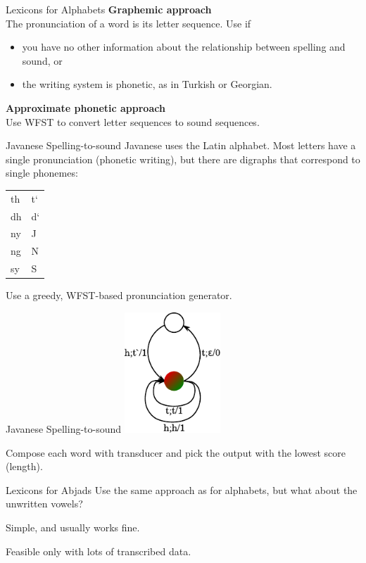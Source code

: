 \begin{frame}{Lexicons for Alphabets}{}
  {\color{DarkerBlue}\bf Graphemic approach} \\
  The pronunciation of a word is its letter sequence.  Use if
  \begin{itemize}
  \item you have no other information about the relationship between
    spelling and sound, or
  \item the writing system is phonetic, as in Turkish or Georgian.
  \end{itemize}
  \vfill
  {\color{DarkerBlue}\bf Approximate phonetic approach} \\
  Use WFST to convert letter sequences to sound sequences.      
\end{frame}

\begin{frame}{Javanese Spelling-to-sound}{}
  Javanese uses the Latin alphabet.  Most letters have a single
  pronunciation (phonetic writing), but there are digraphs that
  correspond to single phonemes:
  \vfill
  \centering
  \begin{tabular}{@{}l@{$\rightarrow$}l@{}}
    th & t` \\
    dh & d` \\
    ny & J  \\
    ng & N  \\
    sy & S  \\
  \end{tabular}
  \vfill
  \raggedright
  Use a greedy, WFST-based pronunciation generator.
\end{frame}

\begin{frame}{Javanese Spelling-to-sound}{}
  \centering
  \includegraphics[width=36mm]{figures/Javanese}
  \vfill
  \raggedright
  Compose each word with transducer and pick the output with the
  lowest score (length).
  \vfill
\end{frame}

\begin{frame}{Lexicons for Abjads}{}
Use the same approach as for alphabets, but what about the unwritten
vowels?
\vfill
\begin{description}
\item[Ignore them] Simple, and usually works fine.
\item[Infer them] Feasible only with lots of transcribed data.
\end{description}
\end{frame}

